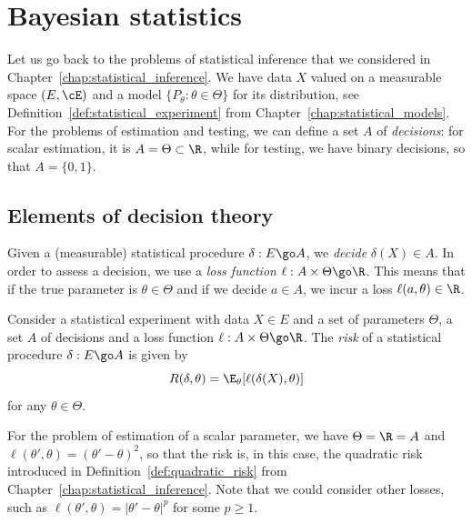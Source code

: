 \setchapterpreamble[u]{\margintoc}
\chapter{Bayesian statistics}
\label{chap:bayesian_statistics}

Let us go back to the problems of statistical inference that we considered in Chapter~\ref{chap:statistical_inference}.
We have data $X$ valued on a measurable space $(E, \cE)$ and a model $\{ P_\theta : \theta \in \Theta\}$ for its distribution, see Definition~\ref{def:statistical_experiment} from Chapter~\ref{chap:statistical_models}.
For the problems of estimation and testing, we can define a set $A$ of \emph{decisions}: for scalar estimation, it is $A = \Theta \subset \R$, while for testing, we have binary decisions, so that $A = \{ 0, 1 \}$.

\section{Elements of decision theory} %
\label{sec:elements_of_decision_theory}

Given a (measurable) statistical procedure $\delta : E \go A$, we \emph{decide} $\delta(X) \in A$.
In order to assess a decision, we use a \emph{loss function} $\ell : A \times \Theta \go \R$.
This means that if the true parameter is $\theta \in \Theta$ and if we decide $a \in A$, we incur a loss $\ell(a, \theta) \in \R$.

\begin{definition}
	Consider a statistical experiment with data $X \in E$ and a set of parameters $\Theta$, a set $A$ of decisions and a loss function $\ell : A \times \Theta \go \R$. The \emph{risk} of a statistical procedure $\delta : E \go A$ is given by
	\begin{equation*}
		R(\delta, \theta) = \E_\theta[ \ell(\delta(X), \theta)]
	\end{equation*}
	for any $\theta \in \Theta$.
\end{definition}

For the problem of estimation of a scalar parameter, we have $\Theta = \R = A$ and $\ell(\theta', \theta) = (\theta' - \theta)^2$, so that the risk is, in this case, the quadratic risk introduced in Definition~\ref{def:quadratic_risk} from Chapter~\ref{chap:statistical_inference}.
Note that we could consider other losses, such as $\ell(\theta', \theta) = |\theta' - \theta|^p$ for some $p \geq 1$.


